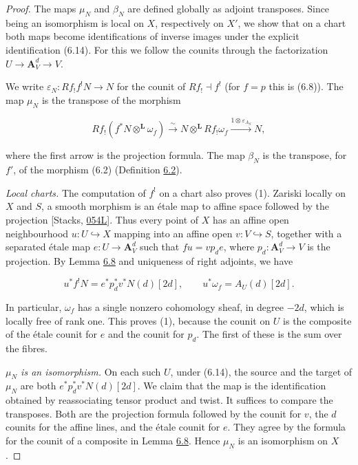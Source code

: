 \documentclass[11pt]{article}
\begin{document}
\begin{proof}[{Proof}]\label{bp31}%
The maps \(\mu_N\) and \(\beta_N\) are defined globally as adjoint transposes. Since being an isomorphism is local on \(X\), respectively on \(X'\), we show that on a chart both maps become identifications of inverse images under the explicit identification (6.14). For this we follow the counits through the factorization \(U\to\mathbf A^d_V\to V\).

We write \(\varepsilon_N:Rf_!f^!N\to N\) for the counit of \(Rf_!\dashv f^!\) (for \(f=p\) this is (6.8)). The map \(\mu_N\) is the transpose of the morphism

\[
Rf_!(f^*N\otimes^{\mathbf L}\omega_f)
\xrightarrow{\ \sim\ }
N\otimes^{\mathbf L}Rf_!\omega_f
\xrightarrow{1\otimes\varepsilon_{A_S}}N ,
\]

where the first arrow is the projection formula. The map \(\beta_N\) is the transpose, for \(f'\), of the morphism (6.2) (Definition \hyperref[bp7]{6.2}).

\emph{Local charts.} The computation of \(f^!\) on a chart also proves (1). Zariski locally on \(X\) and \(S\), a smooth morphism is an étale map to affine space followed by the projection [Stacks, \href{https://stacks.math.columbia.edu/tag/054L}{054L}]. Thus every point of \(X\) has an affine open neighbourhood \(u:U\hookrightarrow X\) mapping into an affine open \(v:V\hookrightarrow S\), together with a separated étale map \(e:U\to\mathbf A^d_V\) such that \(fu=vp_de\), where \(p_d:\mathbf A^d_V\to V\) is the projection. By Lemma \hyperref[bp26]{6.8} and uniqueness of right adjoints, we have

\[
u^*f^!N=e^*p_d^*v^*N(d)[2d],\qquad
u^*\omega_f=A_U(d)[2d].
\tag{6.14}
\]

In particular, \(\omega_f\) has a single nonzero cohomology sheaf, in degree \(-2d\), which is locally free of rank one. This proves (1), because the counit on \(U\) is the composite of the étale counit for \(e\) and the counit for \(p_d\). The first of these is the sum over the fibres.

\emph{\(\mu_N\) is an isomorphism.} On each such \(U\), under (6.14), the source and the target of \(\mu_N\) are both \(e^*p_d^*v^*N(d)[2d]\). We claim that the map is the identification obtained by reassociating tensor product and twist. It suffices to compare the transposes. Both are the projection formula followed by the counit for \(v\), the \(d\) counits for the affine lines, and the étale counit for \(e\). They agree by the formula for the counit of a composite in Lemma \hyperref[bp26]{6.8}. Hence \(\mu_N\) is an isomorphism on \(X\).


\end{proof}
\end{document}

